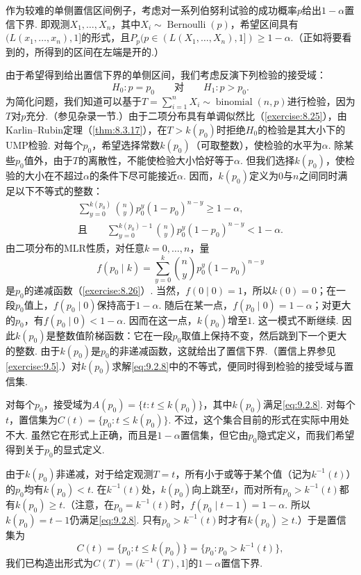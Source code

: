 \begin{example}[二项分布单侧置信界]\label{ex:9.2.5}
作为较难的单侧置信区间例子，考虑对一系列伯努利试验的成功概率$p$给出$1-\alpha$置信下界. 即观测$X_1,\ldots,X_n$，其中$X_i\sim\operatorname{Bernoulli}(p)$，希望区间具有$(L(x_1,\ldots,x_n),1]$的形式，且$P_p(p\in(L(X_1,\ldots,X_n),1])\ge1-\alpha$.（正如将要看到的，所得到的区间在左端是开的.）

由于希望得到给出置信下界的单侧区间，我们考虑反演下列检验的接受域：
$$H_0:p=p_0\qquad\text{对}\qquad H_1:p>p_0.$$
为简化问题，我们知道可以基于$T=\sum_{i=1}^nX_i\sim\operatorname{binomial}(n,p)$进行检验，因为$T$对$p$充分.（参见杂录一节.）由于二项分布具有单调似然比（\autoref{exercise:8.25}），由Karlin--Rubin定理（\autoref{thm:8.3.17}），在$T>k(p_0)$时拒绝$H_0$的检验是其大小下的UMP检验. 对每个$p_0$，希望选择常数$k(p_0)$（可取整数），使检验的水平为$\alpha$. 除某些$p_0$值外，由于$T$的离散性，不能使检验大小恰好等于$\alpha$. 但我们选择$k(p_0)$，使检验的大小在不超过$\alpha$的条件下尽可能接近$\alpha$. 因而，$k(p_0)$定义为$0$与$n$之间同时满足以下不等式的整数：
\begin{equation}\label{eq:9.2.8}
\begin{gathered}
\sum_{y=0}^{k(p_0)}\binom ny p_0^y(1-p_0)^{n-y}\ge1-\alpha,\\
\text{且}\qquad\sum_{y=0}^{k(p_0)-1}\binom ny p_0^y(1-p_0)^{n-y}<1-\alpha.
\end{gathered}
\end{equation}
由二项分布的MLR性质，对任意$k=0,\ldots,n$，量
$$f(p_0\mid k)=\sum_{y=0}^k\binom ny p_0^y(1-p_0)^{n-y}$$
是$p_0$的递减函数（\autoref{exercise:8.26}）. 当然，$f(0\mid0)=1$，所以$k(0)=0$；在一段$p_0$值上，$f(p_0\mid0)$保持高于$1-\alpha$. 随后在某一点，$f(p_0\mid0)=1-\alpha$；对更大的$p_0$，有$f(p_0\mid0)<1-\alpha$. 因而在这一点，$k(p_0)$增至$1$.
这一模式不断继续. 因此$k(p_0)$是整数值阶梯函数：它在一段$p_0$取值上保持不变，然后跳到下一个更大的整数. 由于$k(p_0)$是$p_0$的非递减函数，这就给出了置信下界.（置信上界参见\autoref{exercise:9.5}.）对$k(p_0)$求解\eqref{eq:9.2.8}中的不等式，便同时得到检验的接受域与置信集.

对每个$p_0$，接受域为$A(p_0)=\{t:t\le k(p_0)\}$，其中$k(p_0)$满足\eqref{eq:9.2.8}. 对每个$t$，置信集为$C(t)=\{p_0:t\le k(p_0)\}$. 不过，这个集合目前的形式在实际中用处不大. 虽然它在形式上正确，而且是$1-\alpha$置信集，但它由$p_0$隐式定义，而我们希望得到关于$p_0$的显式定义.

由于$k(p_0)$非递减，对于给定观测$T=t$，所有小于或等于某个值（记为$k^{-1}(t)$）的$p_0$均有$k(p_0)<t$. 在$k^{-1}(t)$处，$k(p_0)$向上跳至$t$，而对所有$p_0>k^{-1}(t)$都有$k(p_0)\ge t$.（注意，在$p_0=k^{-1}(t)$时，$f(p_0\mid t-1)=1-\alpha$. 所以$k(p_0)=t-1$仍满足\eqref{eq:9.2.8}. 只有$p_0>k^{-1}(t)$时才有$k(p_0)\ge t$.）于是置信集为
\begin{equation}\label{eq:9.2.9}
C(t)=\{p_0:t\le k(p_0)\}=\{p_0:p_0>k^{-1}(t)\},
\end{equation}
我们已构造出形式为$C(T)=(k^{-1}(T),1]$的$1-\alpha$置信下界.


\end{example}
